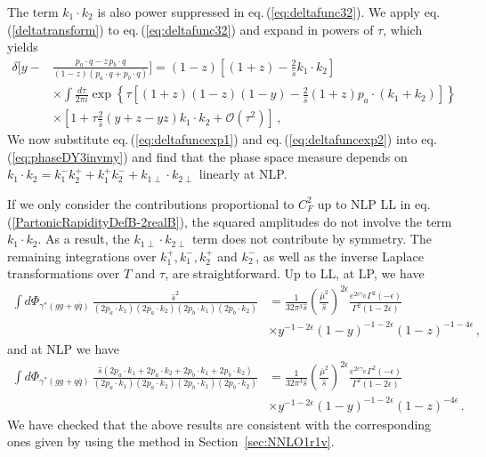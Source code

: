 \documentclass[11pt]{article}
\newcommand{\eps}{\epsilon}
\newcommand{\s}{\hat{s}}
\newcommand\eqn[1]     {eq.\,(\ref{#1})}
\begin{document}
The term $k_1\cdot k_2$ is also power suppressed in \eqn{eq:deltafunc32}. We apply \eqn{deltatransform} to \eqn{eq:deltafunc32} and expand in powers of $\tau$, which yields 
%
\begin{align}\label{eq:deltafuncexp2}
    \delta\bigg[y - & \frac{p_a \cdot q - z \, p_b \cdot q}{(1-z) (p_a \cdot q + p_b \cdot q)} \bigg] = (1-z)\left[(1+z)-\frac{2}{\hat{s}}k_1\cdot k_2\right] \nonumber \\
    &\times\int\frac{d\tau}{2\pi i}\exp\left\{\tau\left[(1+z)(1-z)(1-y)-\frac{2}{\hat{s}}(1+z)p_a\cdot(k_1+k_2)\right] \right\}\nonumber \\
    &\times\left[1+\tau\frac{2}{\hat{s}}(y+z-yz)k_1\cdot k_2+\mathcal{O}\left(\tau^2\right)\right]\,,
\end{align}
%
We now substitute \eqn{eq:deltafuncexp1} and \eqn{eq:deltafuncexp2} into \eqn{eq:phaseDY3invmy} and find that the phase space measure depends on $k_1\cdot k_2=k_1^-k_2^+ + k_1^+k_2^-+k_{1\perp}\cdot k_{2\perp}$ linearly at NLP. 

If we only consider the contributions proportional to $C_F^2$ up to NLP LL in \eqn{PartonicRapidityDefB-2realB}, the squared amplitudes do not involve the term $k_1\cdot k_2$. As a result, the $k_{1\perp}\cdot k_{2\perp}$ term does not contribute by symmetry. The remaining integrations over $k_1^+,k_1^-,k_2^+$ and $k_2^-$, as well as the inverse Laplace transformations over $T$ and $\tau$, are straightforward. Up to LL, at LP, we have
%
\begin{align}
    \int d \Phi_{\gamma^*(gg+q\bar q)} \, \frac{\hat{s}^2}{(2p_a\cdot k_1)(2p_a\cdot k_2)(2p_b\cdot k_1)(2p_b\cdot k_2)}&= \frac{1}{32\pi^3 \s}\left(\frac{\bar\mu^2}{\s}\right)^{2\eps}\frac{e^{2\eps\gamma_E}\Gamma^2(-\epsilon)}{\Gamma^2(1-2\epsilon)} \nonumber \\
    &\times y^{-1-2\epsilon}(1-y)^{-1-2\epsilon}(1-z)^{-1-4\epsilon}\,,
\end{align}
%
and at NLP we have
%
\begin{align}
    \int d \Phi_{\gamma^*(gg+q\bar q)} \, \frac{\hat{s}(2p_a\cdot k_1+2p_a\cdot k_2+2p_b\cdot k_1+2p_b\cdot k_2)}{(2p_a\cdot k_1)(2p_a\cdot k_2)(2p_b\cdot k_1)(2p_b\cdot k_2)}&= \frac{1}{32\pi^3 \s}\left(\frac{\bar\mu^2}{\s}\right)^{2\eps}\frac{e^{2\eps\gamma_E}\Gamma^2(-\epsilon)}{\Gamma^2(1-2\epsilon)} \nonumber \\
    &\times y^{-1-2\epsilon}(1-y)^{-1-2\epsilon}(1-z)^{-4\epsilon}\,.
\end{align}
%
We have checked that the above results are consistent with the corresponding ones given by using the method in Section~\ref{sec:NNLO1r1v}. 
\end{document}
